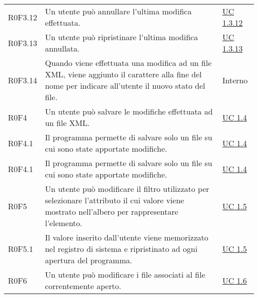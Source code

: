 \begin{center}
\begin{longtable}{p{4.2cm}!{\color{white}\vrule width 0.5mm}p{6cm}!{\color{white}\vrule width 0.5mm}p{2.5cm}!{\color{white}\vrule width 0.5mm}}
	
			\hspace{2mm}\hypertarget{XER0F3.12}{R0F3.12} & Un utente può annullare l'ultima modifica effettuata. & \hyperref[subsec:XEUC1.3.12]{UC 1.3.12}\\
			
			\hspace{2mm}\hypertarget{XER0F3.13}{R0F3.13} & Un utente può ripristinare l'ultima modifica annullata. & \hyperref[subsec:XEUC1.3.13]{UC 1.3.13}\\
	
	
	
			\hspace{2mm}\hypertarget{R0F3.14}{R0F3.14} & Quando viene effettuata una modifica ad un file XML, viene aggiunto il carattere \sq{*} alla fine del nome per indicare all'utente il nuovo stato del file. & Interno\\
		
		
		\hspace{0mm}\hypertarget{XER0F4}{R0F4} & Un utente può salvare le modifiche effettuata ad un file XML. & \hyperref[subsec:XEUC1.4]{UC 1.4}\\
		
			\hspace{0mm}\hypertarget{XER0F4.1}{R0F4.1} & Il programma permette di salvare solo un file su cui sono state apportate modifiche. & \hyperref[subsec:XEUC1.4]{UC 1.4}\\
			
			\hspace{0mm}\hypertarget{XER0F4.1}{R0F4.1} & Il programma permette di salvare solo un file su cui sono state apportate modifiche. & \hyperref[subsec:XEUC1.4]{UC 1.4}\\
		
		\hspace{0mm}\hypertarget{XER0F5}{R0F5} & Un utente può modificare il filtro utilizzato per selezionare l'attributo il cui valore viene mostrato nell'albero per rappresentare l'elemento. & \hyperref[subsec:XEUC1.5]{UC 1.5}\\
			
			\hspace{0mm}\hypertarget{XER0F5.1}{R0F5.1} & Il valore inserito dall'utente viene memorizzato nel registro di sistema e ripristinato ad ogni apertura del programma. & \hyperref[subsec:XEUC1.5]{UC 1.5}\\
			
		\hspace{0mm}\hypertarget{XER0F6}{R0F6} & Un utente può modificare i file associati al file correntemente aperto. & \hyperref[subsec:XEUC1.6]{UC 1.6}\\
			

\end{longtable}
\end{center}

